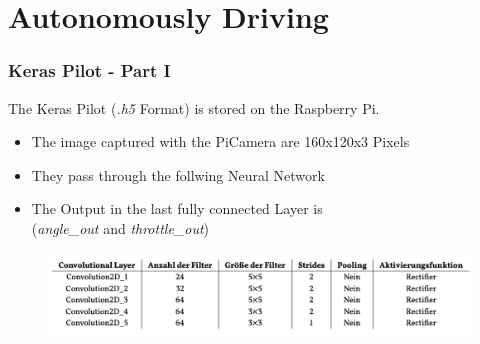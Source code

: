 \documentclass{beamer}
\begin{document}
\section{Autonomously Driving}
\begin{frame}
\frametitle{Keras Pilot - Part I}
The Keras Pilot (\textit{.h5} Format) is stored on the Raspberry Pi. 

\begin{itemize}
\item The image captured with the PiCamera are 160x120x3 Pixels
\item They pass through the follwing Neural Network
\item The Output in the last fully connected Layer is \\ (\textit{angle\_out} and \textit{throttle\_out})
\end{itemize}

\begin{figure}
\includegraphics[width=1\linewidth]{photo/cnn_table}
\end{figure}

\end{frame}
\end{document}
